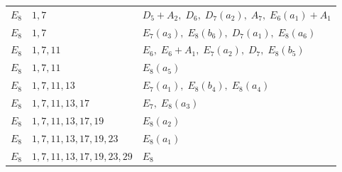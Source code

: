 \begin{longtable}{@{}lp{29mm}p{91mm}@{}}
$E_{8}$&$1,\allowbreak 7$&$D_{5}+A_{2},\allowbreak\;D_{6},\allowbreak\;D_{7}(a_{2}),\allowbreak\;A_{7},\allowbreak\;E_{6}(a_{1})+A_{1}$\\
$E_{8}$&$1,\allowbreak 7$&$E_{7}(a_{3}),\allowbreak\;E_{8}(b_{6}),\allowbreak\;D_{7}(a_{1}),\allowbreak\;E_{8}(a_{6})$\\
$E_{8}$&$1,\allowbreak 7,\allowbreak 11$&$E_{6},\allowbreak\;E_{6}+A_{1},\allowbreak\;E_{7}(a_{2}),\allowbreak\;D_{7},\allowbreak\;E_{8}(b_{5})$\\
$E_{8}$&$1,\allowbreak 7,\allowbreak 11$&$E_{8}(a_{5})$\\
$E_{8}$&$1,\allowbreak 7,\allowbreak 11,\allowbreak 13$&$E_{7}(a_{1}),\allowbreak\;E_{8}(b_{4}),\allowbreak\;E_{8}(a_{4})$\\
$E_{8}$&$1,\allowbreak 7,\allowbreak 11,\allowbreak 13,\allowbreak 17$&$E_{7},\allowbreak\;E_{8}(a_{3})$\\
$E_{8}$&$1,\allowbreak 7,\allowbreak 11,\allowbreak 13,\allowbreak 17,\allowbreak 19$&$E_{8}(a_{2})$\\
$E_{8}$&$1,\allowbreak 7,\allowbreak 11,\allowbreak 13,\allowbreak 17,\allowbreak 19,\allowbreak 23$&$E_{8}(a_{1})$\\
$E_{8}$&$1,\allowbreak 7,\allowbreak 11,\allowbreak 13,\allowbreak 17,\allowbreak 19,\allowbreak 23,\allowbreak 29$&$E_{8}$\\
\bottomrule
\end{longtable}
